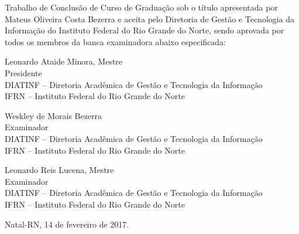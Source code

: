 \begin{folhadeaprovacao}
	\setlength{\ABNTsignthickness}{0.4pt}
	\setlength{\ABNTsignwidth}{10cm}

	\noindent
	Trabalho de Conclusão de Curso de Graduação sob o título
	\textit{\ABNTtitulodata} apresentada por Mateus Oliveira Costa Bezerra e aceita pelo Diretoria
	de Gestão e Tecnologia da Informação do Instituto Federal do Rio Grande do
	Norte, sendo aprovada por todos os membros da banca examinadora abaixo especificada:

	\assinatura
	{
		Leonardo Ataide Minora, Mestre   			                  \\
		{\small Presidente}											          \smallskip\\
		{\footnotesize
			DIATINF -- Diretoria Acadêmica de Gestão e Tecnologia da Informação		   \\
		  	IFRN -- Instituto Federal do Rio Grande do Norte
		}
   }

   \assinatura
	{
        Weskley de Morais Bezerra  			                  \\
		{\small Examinador}									          \smallskip\\
		{\footnotesize
            DIATINF -- Diretoria Acadêmica de Gestão e Tecnologia da Informação		   \\
		  	IFRN -- Instituto Federal do Rio Grande do Norte
		}
   }

   \assinatura
	{  	
        Leonardo Reis Lucena, Mestre 			                  \\
		{\small Examinador}											          \smallskip\\
		{\footnotesize
            DIATINF -- Diretoria Acadêmica de Gestão e Tecnologia da Informação		   \\
		  	IFRN -- Instituto Federal do Rio Grande do Norte
		}
	}

	\vfill

	\begin{center}
		Natal-RN, 14 de fevereiro de 2017.
	\end{center}
\end{folhadeaprovacao}
